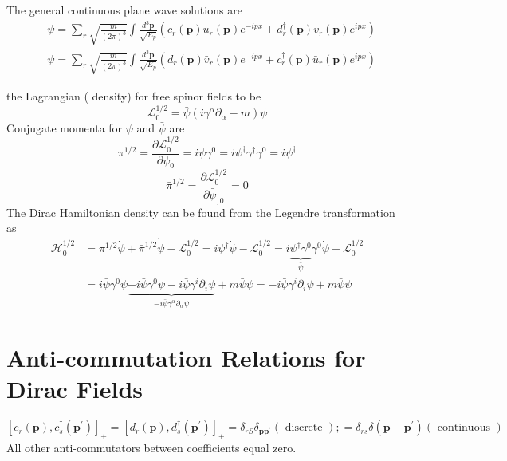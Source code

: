The general continuous plane wave solutions are
\begin{equation}
\begin{aligned}
&\psi=\sum_{r} \sqrt{\frac{m}{(2 \pi)^{3}}} \int \frac{d^{3} \mathbf{p}}{\sqrt{E_{p}}}\left(c_{r}(\mathbf{p}) u_{r}(\mathbf{p}) e^{-i p x}+d_{r}^{\dagger}(\mathbf{p}) v_{r}(\mathbf{p}) e^{i p x}\right)\\
&\bar{\psi}=\sum_{r} \sqrt{\frac{m}{(2 \pi)^{3}}} \int \frac{d^{3} \mathbf{p}}{\sqrt{E_{p}}}\left(d_{r}(\mathbf{p}) \bar{v}_{r}(\mathbf{p}) e^{-i p x}+c_{r}^{\dagger}(\mathbf{p}) \bar{u}_{r}(\mathbf{p}) e^{i p x}\right)
\end{aligned}
\end{equation}
\begin{qt}
the Lagrangian ( density) for free spinor fields to be
\begin{equation}
\mathcal{L}_{0}^{1/2}=\bar{\psi}\left(i \gamma^{\alpha} \partial_{\alpha}-m\right) \psi
\end{equation}
Conjugate momenta for $\psi$ and $\bar{\psi}$ are
\begin{equation}
\pi^{1 / 2}=\frac{\partial \mathcal{L}_{0}^{1 / 2}}{\partial \psi_{0}}=i \psi \gamma^{0}=i \psi^{\dagger} \gamma^{\dagger} \gamma^{0}=i \psi^{\dagger}
\end{equation}
\begin{equation}
\bar{\pi}^{1 / 2}=\frac{\partial \mathcal{L}_{0}^{1 / 2}}{\partial \bar{\psi}_{, 0}}=0
\end{equation}
The Dirac Hamiltonian density can be found from the Legendre transformation as
\begin{equation}
\begin{aligned}
\mathcal{H}_{0}^{1 / 2} &=\pi^{1 / 2} \dot{\psi}+\bar{\pi}^{1 / 2} \dot{\bar{\psi}}-\mathcal{L}_{0}^{1 / 2}=i \psi^{\dagger} \dot{\psi}-\mathcal{L}_{0}^{1 / 2}=i \underbrace{\psi^{\dagger} \gamma^{0}}_{\bar{\psi}} \gamma^{0} \dot{\psi}-\mathcal{L}_{0}^{1 / 2} \\
&=i \bar{\psi} \gamma^{0} \dot{\psi}\underbrace{-i \bar{\psi} \gamma^{0} \dot{\psi}-i \bar{\psi} \gamma^{i} \partial_{i} \psi}_{-i\bar{\psi}\gamma^{\alpha}\partial_{\alpha}\psi}+m \bar{\psi} \psi=-i \bar{\psi} \gamma^{i} \partial_{i} \psi+m \bar{\psi} \psi
\end{aligned}
\end{equation}
\end{qt}
\section{Anti-commutation Relations for Dirac Fields}
\begin{qt}
\begin{equation}
    \left[c_{r}(\mathbf{p}), c_{s}^{\dagger}\left(\mathbf{p}^{\prime}\right)\right]_{+}=\left[d_{r}(\mathbf{p}), d_{s}^{\dagger}\left(\mathbf{p}^{\prime}\right)\right]_{+}=\delta_{r S} \delta_{\mathbf{p p}^{\prime}}(\text { discrete }) ;=\delta_{r s} \delta(\mathbf{p - p ^ { \prime }})(\text { continuous })
\end{equation}
All other anti-commutators between coefficients equal zero.
\end{qt}
